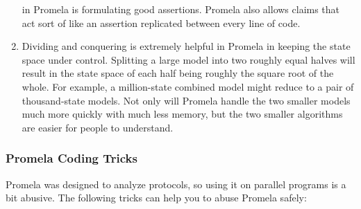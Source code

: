 \begin{enumerate}
	in Promela is formulating good assertions.  Promela also allows
	 claims that act sort of like an assertion replicated
	between every line of code.
\item	Dividing and conquering is extremely helpful in Promela in keeping
	the state space under control.  Splitting a large model into two
	roughly equal halves will result in the state space of each
	half being roughly the square root of the whole.
	For example, a million-state combined model might reduce to a
	pair of thousand-state models.
	Not only will Promela handle the two smaller models much more
	quickly with much less memory, but the two smaller algorithms
	are easier for people to understand.
\end{enumerate}


\subsubsection{Promela Coding Tricks}
\label{sec:formal:Promela Coding Tricks}

Promela was designed to analyze protocols, so using it on parallel programs
is a bit abusive.
The following tricks can help you to abuse Promela safely:

